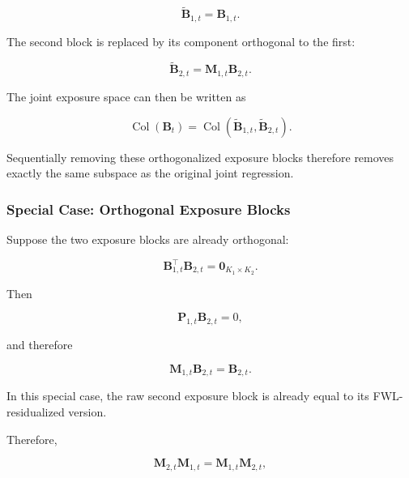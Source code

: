 \documentclass[11pt,a4paper]{article}
\begin{document}
\begin{equation}
\widetilde{\mathbf{B}}_{1,t}
=
\mathbf{B}_{1,t}.
\end{equation}

The second block is replaced by its component orthogonal to the first:

\begin{equation}
\widetilde{\mathbf{B}}_{2,t}
=
\mathbf{M}_{1,t}
\mathbf{B}_{2,t}.
\end{equation}

The joint exposure space can then be written as

\begin{equation}
\operatorname{Col}(\mathbf{B}_t)
=
\operatorname{Col}
\left(
\widetilde{\mathbf{B}}_{1,t},
\widetilde{\mathbf{B}}_{2,t}
\right).
\end{equation}

Sequentially removing these orthogonalized exposure blocks therefore removes
exactly the same subspace as the original joint regression.


\subsubsection{Special Case: Orthogonal Exposure Blocks}

Suppose the two exposure blocks are already orthogonal:

\begin{equation}
\boxed{
\mathbf{B}_{1,t}^{\top}
\mathbf{B}_{2,t}
=
\mathbf{0}_{K_1\times K_2}.
}
\end{equation}

Then

\begin{equation}
\mathbf{P}_{1,t}
\mathbf{B}_{2,t}
=
0,
\end{equation}

and therefore

\begin{equation}
\boxed{
\mathbf{M}_{1,t}
\mathbf{B}_{2,t}
=
\mathbf{B}_{2,t}.
}
\end{equation}

In this special case, the raw second exposure block is already equal to its
FWL-residualized version.

Therefore,

\begin{equation}
\mathbf{M}_{2,t}
\mathbf{M}_{1,t}
=
\mathbf{M}_{1,t}
\mathbf{M}_{2,t},
\end{equation}
\end{document}
